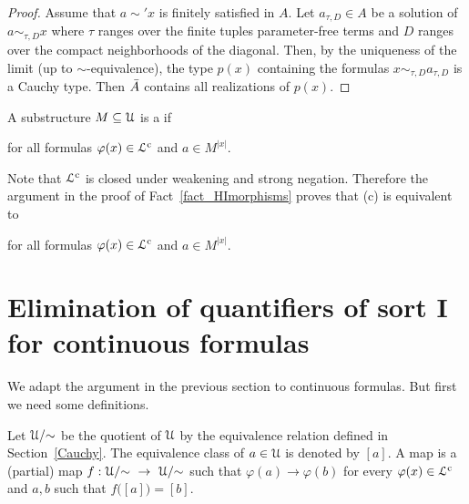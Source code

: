\documentclass[10pt,oneside]{amsproc}
\renewcommand*{\emph}[1]{%
   \smash{\tikz[baseline]\node[rectangle, fill=teal!25, rounded corners, inner xsep=0.5ex, inner ysep=0.2ex, anchor=base, minimum height = 2.7ex]{\strut #1};}}
\begin{document}
{\begin{proof}
  Assume that $a\sim'x$ is finitely satisfied in $A$. 
  Let $a_{\tau,D}\in A$ be a solution of $a\sim_{\tau,D}x$ where $\tau$ ranges over the finite tuples parameter-free terms and $D$ ranges over the compact neighborhoods of the diagonal.
  Then, by the uniqueness of the limit (up to $\sim$-equivalence), the type $p(x)$ containing the formulas $x\sim_{\tau,D}a_{\tau,D}$ is a Cauchy type.
  Then $\Bar A$ contains all realizations of $p(x)$.
\end{proof}

A substructure $M\subseteq{\EuScript U}$ is a \emph{c-model\/} if 

\hfill
for all formulas $\varphi(x)\in{\EuScript L}^{\rm c}$ and $a\in M^{|x|}$.

Note that ${\EuScript L}^{\rm c}$ is closed under weakening and strong negation.
Therefore the argument in the proof of Fact~\ref{fact_HImorphisms} proves that (c) is equivalent to

\hfill
for all formulas $\varphi(x)\in{\EuScript L}^{\rm c}$ and $a\in M^{|x|}$.





\section{Elimination of quantifiers of sort \textsf{I} for continuous formulas}\label{IeliminationC}

We adapt the argument in the previous section to continuous formulas.
But first we need some definitions.

Let ${\EuScript U}/{\sim}$ be the quotient of ${\EuScript U}$ by the equivalence relation defined in Section~\ref{Cauchy}.
The equivalence class of $a\in{\EuScript U}$ is denoted by $[a]$.
A \emph{c-elementary\/} map is a (partial) map $f:{\EuScript U}/{\sim}\ \to\ {\EuScript U}/{\sim}$ such that $\varphi(a)\rightarrow\varphi(b)$ for every $\varphi(x)\in{\EuScript L}^{\rm c}$ and $a,b$ such that $f\big([a]\big)=[b]$.

}
\end{document}
